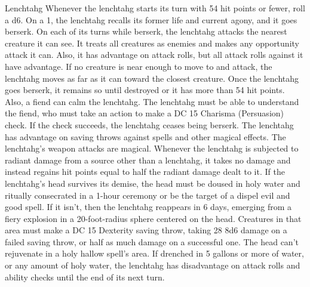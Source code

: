 \documentclass[10pt,a4paper,twoside,twocolumn,openany,bg=print,nodeprecatedcode]{dndbook}
\begin{document}
\begin{DndMonster}[float*=t]{Lenchtahg}
\DndMonsterBasics[
armor-class = {15 (natural armor)},
hit-points = {\DndDice{13d8 + 52}},
speed = {40 ft.}
]
\DndMonsterAbilityScores[
 str = 18,
 dex = 11,
 con = 18,
 int = 10,
 wis = 11,
 cha = 13
]
\DndMonsterDetails[
skills = {Perception +3},
damage-resistances = {; bludgeoning, piercing, slashing from nonmagical attacks},
damage-immunities = {fire, poison, radiant},
senses = {darkvision 120 ft., passive perception 13},
languages = {Abyssal, Celestial, Infernal},
challenge = 5,
]
Whenever the lenchtahg starts its turn with 54 hit points or fewer, roll a d6. On a 1, the lenchtahg recalls its former life and current agony, and it goes berserk. On each of its turns while berserk, the lenchtahg attacks the nearest creature it can see. It treats all creatures as enemies and makes any opportunity attack it can. Also, it has advantage on attack rolls, but all attack rolls against it have advantage. If no creature is near enough to move to and attack, the lenchtahg moves as far as it can toward the closest creature.
Once the lenchtahg goes berserk, it remains so until destroyed or it has more than 54 hit points. Also, a fiend can calm the lenchtahg. The lenchtahg must be able to understand the fiend, who must take an action to make a DC 15 Charisma (Persuasion) check. If the check succeeds, the lenchtahg ceases being berserk.
The lenchtahg has advantage on saving throws against spells and other magical effects.
The lenchtahg's weapon attacks are magical.
Whenever the lenchtahg is subjected to radiant damage from a source other than a lenchtahg, it takes no damage and instead regains hit points equal to half the radiant damage dealt to it.
If the lenchtahg's head survives its demise, the head must be doused in holy water and ritually consecrated in a 1-hour ceremony or be the target of a dispel evil and good spell. If it isn't, then the lenchtahg reappears in 6 days, emerging from a fiery explosion in a 20-foot-radius sphere centered on the head. Creatures in that area must make a DC 15 Dexterity saving throw, taking 28 8d6 damage on a failed saving throw, or half as much damage on a successful one. The head can't rejuvenate in a holy hallow spell's area.
If drenched in 5 gallons or more of water, or any amount of holy water, the lenchtahg has disadvantage on attack rolls and ability checks until the end of its next turn.

\end{DndMonster}
\end{document}
